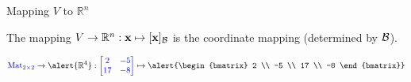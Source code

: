 \documentclass[xcolor=dvipsnames,aspectratio=169,t]{beamer}
\begin{document}
\begin{frame}{Mapping $V$ to $\mathbb{R}^n$}

\begin{definition}
The mapping $V \to \mathbb{R}^n: \mathbf{x} \mapsto \lbrack \mathbf{x} \rbrack_{\mathcal{B}}$ is the \alert{coordinate mapping} (determined by $\mathcal{B}$).
\end{definition}



\[ \colorb{\mbox{Mat}_{2 \times 2}} \to \alert{\mathbb{R}^4}: \colorb{\begin{bmatrix} 2 & -5  \\ 17 & -8 \end{bmatrix}} \mapsto \alert{\begin{bmatrix} 2 \\ -5 \\ 17 \\ -8 \end{bmatrix}} \]

\end{frame}
\end{document}
